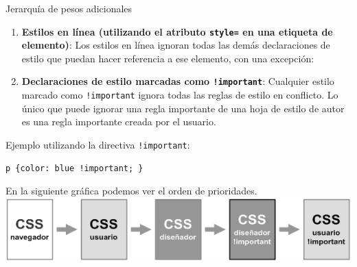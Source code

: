 \begin{frame}{Jerarquía de pesos adicionales }
\begin{enumerate}
        \item \textbf{Estilos en línea (utilizando el atributo \texttt{style=}
        en una etiqueta de elemento)}: Los estilos en línea ignoran todas las
        demás declaraciones de estilo que puedan hacer referencia a ese
        elemento, con una excepción: 

        \item \textbf{Declaraciones de estilo marcadas como
        \texttt{!important}}: Cualquier estilo marcado como \texttt{!important}
        ignora todas las reglas de estilo en conflicto. Lo único que puede
        ignorar una regla importante de una hoja de estilo de autor es una
        regla importante creada por el usuario. 
    \end{enumerate}
        
        Ejemplo utilizando la directiva \texttt{!important}: 

        \begin{lstlisting}
p {color: blue !important; }
        \end{lstlisting}

        En la siguiente gráfica podemos ver el orden de prioridades. \\[0.5cm]

        \includegraphics[scale=0.55]{imgs/css-orden.png}
\end{frame}


